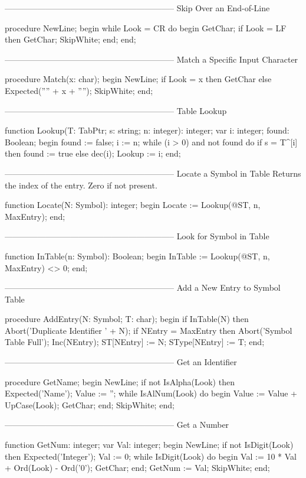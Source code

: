 \documentclass[float=false, crop=false]{standalone}
\begin{document}
\begin{code}
{--------------------------------------------------------------}
{ Skip Over an End-of-Line }

procedure NewLine;
begin
   while Look = CR do begin
      GetChar;
      if Look = LF then GetChar;
      SkipWhite;
   end;
end;


{--------------------------------------------------------------}
{ Match a Specific Input Character }

procedure Match(x: char);
begin
   NewLine;
   if Look = x then GetChar
   else Expected('''' + x + '''');
   SkipWhite;
end;


{--------------------------------------------------------------}
{ Table Lookup }

function Lookup(T: TabPtr; s: string; n: integer): integer;
var i: integer;
    found: Boolean;
begin
   found := false;
   i := n;
   while (i > 0) and not found do
      if s = T^[i] then
         found := true
      else
         dec(i);
   Lookup := i;
end;


{--------------------------------------------------------------}
{ Locate a Symbol in Table }
{ Returns the index of the entry.  Zero if not present. }

function Locate(N: Symbol): integer;
begin
   Locate := Lookup(@ST, n, MaxEntry);
end;


{--------------------------------------------------------------}
{ Look for Symbol in Table }

function InTable(n: Symbol): Boolean;
begin
   InTable := Lookup(@ST, n, MaxEntry) <> 0;
end;


{--------------------------------------------------------------}
{ Add a New Entry to Symbol Table }

procedure AddEntry(N: Symbol; T: char);
begin
   if InTable(N) then Abort('Duplicate Identifier ' + N);
   if NEntry = MaxEntry then Abort('Symbol Table Full');
   Inc(NEntry);
   ST[NEntry] := N;
   SType[NEntry] := T;
end;


{--------------------------------------------------------------}
{ Get an Identifier }

procedure GetName;
begin
   NewLine;
   if not IsAlpha(Look) then Expected('Name');
   Value := '';
   while IsAlNum(Look) do begin
      Value := Value + UpCase(Look);
      GetChar;
   end;
   SkipWhite;
end;


{--------------------------------------------------------------}
{ Get a Number }

function GetNum: integer;
var Val: integer;
begin
   NewLine;
   if not IsDigit(Look) then Expected('Integer');
   Val := 0;
   while IsDigit(Look) do begin
      Val := 10 * Val + Ord(Look) - Ord('0');
      GetChar;
   end;
   GetNum := Val;
   SkipWhite;
end;



\end{code}
\end{document}
